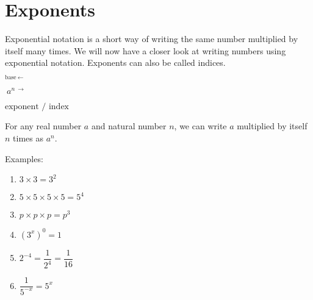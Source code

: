 \chapter{Exponents}
\setcounter{figure}{1}
\setcounter{subfigure}{1}
Exponential notation is a short way of writing the same number multiplied by
itself many times.  We will now have a closer look at writing numbers using exponential notation. Exponents can also be called indices.
 \begin{Large}
\begin{center}
$ _{\mbox{base}~\leftarrow} $\begin{Large} $ ~a^{n~\rightarrow~}$ \end{Large}$\mbox{exponent / index} $
\end{center}
 \end{Large}

For any real number $a$ and natural number $n$, we can write $a$ multiplied by itself $n$ times as $a^n$.

 

Examples:
\begin{enumerate}[itemsep=5pt, label=\textbf{\arabic*.}]
\item $3 \times 3 = 3^2$
\item $5 \times 5 \times 5 \times 5 = 5^4 $
\item $p \times p \times p = p^3$
\item $(3^x)^0 = 1$
\item $ 2^{-4} = \dfrac{1}{2^4} = \dfrac{1}{16}$
\item $ \dfrac{1}{5^{-x}} = 5^x$
\end{enumerate}


